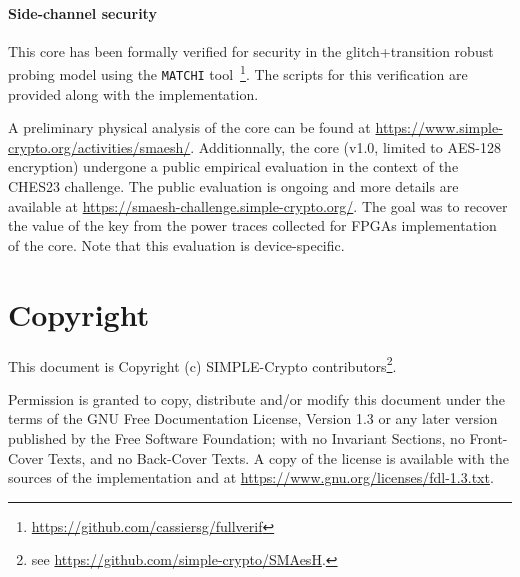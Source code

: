 \documentclass{scrartcl}
\begin{document}
\paragraph{Side-channel security}
This core has been formally verified for security in the glitch+transition
robust probing model using the \texttt{MATCHI}%
tool~\cite{DBLP:journals/tc/CassiersGLS21,DBLP:journals/tches/CassiersS21}\footnote{\url{https://github.com/cassiersg/fullverif}}.
The scripts for this verification are provided along with the implementation.

A preliminary physical analysis of the core can be found at
\url{https://www.simple-crypto.org/activities/smaesh/}.  Additionnally, the
core (v1.0, limited to AES-128 encryption) undergone a public empirical
evaluation in the context of the CHES23 challenge. The public evaluation is
ongoing and more details are available at
\url{https://smaesh-challenge.simple-crypto.org/}.  The goal was to recover the
value of the key from the power traces collected for FPGAs implementation of
the core. Note that this evaluation is device-specific.

\section{Copyright}

This document is Copyright (c) SIMPLE-Crypto contributors\footnote{see \url{https://github.com/simple-crypto/SMAesH}.}.

Permission is granted to copy, distribute and/or modify this document under the
terms of the GNU Free Documentation License, Version 1.3 or any later version
published by the Free Software Foundation; with no Invariant Sections, no
Front-Cover Texts, and no Back-Cover Texts.
A copy of the license is available with the sources of the implementation and
at \url{https://www.gnu.org/licenses/fdl-1.3.txt}.



\end{document}
